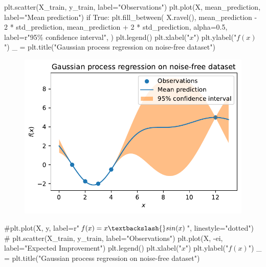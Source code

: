 \documentclass[
  letterpaper,
  DIV=11,
  numbers=noendperiod]{scrreprt}
\newenvironment{Shaded}{\begin{snugshade}}{\end{snugshade}}
\newcommand{\CommentTok}[1]{\textcolor[rgb]{0.37,0.37,0.37}{#1}}
\newcommand{\ControlFlowTok}[1]{\textcolor[rgb]{0.00,0.23,0.31}{#1}}
\newcommand{\DecValTok}[1]{\textcolor[rgb]{0.68,0.00,0.00}{#1}}
\newcommand{\FloatTok}[1]{\textcolor[rgb]{0.68,0.00,0.00}{#1}}
\newcommand{\NormalTok}[1]{\textcolor[rgb]{0.00,0.23,0.31}{#1}}
\newcommand{\OperatorTok}[1]{\textcolor[rgb]{0.37,0.37,0.37}{#1}}
\newcommand{\SpecialCharTok}[1]{\textcolor[rgb]{0.37,0.37,0.37}{#1}}
\newcommand{\StringTok}[1]{\textcolor[rgb]{0.13,0.47,0.30}{#1}}
\newcommand{\VariableTok}[1]{\textcolor[rgb]{0.07,0.07,0.07}{#1}}
\newcommand{\VerbatimStringTok}[1]{\textcolor[rgb]{0.13,0.47,0.30}{#1}}
\begin{document}
\begin{Shaded}
\begin{Highlighting}[]
\NormalTok{plt.scatter(X\_train, y\_train, label}\OperatorTok{=}\StringTok{"Observations"}\NormalTok{)}
\NormalTok{plt.plot(X, mean\_prediction, label}\OperatorTok{=}\StringTok{"Mean prediction"}\NormalTok{)}
\ControlFlowTok{if} \VariableTok{True}\NormalTok{:}
\NormalTok{    plt.fill\_between(}
\NormalTok{        X.ravel(),}
\NormalTok{        mean\_prediction }\OperatorTok{{-}} \DecValTok{2} \OperatorTok{*}\NormalTok{ std\_prediction,}
\NormalTok{        mean\_prediction }\OperatorTok{+} \DecValTok{2} \OperatorTok{*}\NormalTok{ std\_prediction,}
\NormalTok{        alpha}\OperatorTok{=}\FloatTok{0.5}\NormalTok{,}
\NormalTok{        label}\OperatorTok{=}\VerbatimStringTok{r"95}\SpecialCharTok{\% c}\VerbatimStringTok{onfidence interval"}\NormalTok{,}
\NormalTok{    )}
\NormalTok{plt.legend()}
\NormalTok{plt.xlabel(}\StringTok{"$x$"}\NormalTok{)}
\NormalTok{plt.ylabel(}\StringTok{"$f(x)$"}\NormalTok{)}
\NormalTok{\_ }\OperatorTok{=}\NormalTok{ plt.title(}\StringTok{"Gaussian process regression on noise{-}free dataset"}\NormalTok{)}
\end{Highlighting}
\end{Shaded}

\begin{figure}[H]

{\centering \includegraphics{07_spot_ei_files/figure-pdf/cell-45-output-1.pdf}

}

\end{figure}

\begin{Shaded}
\begin{Highlighting}[]
\CommentTok{\#plt.plot(X, y, label=r"$f(x) = x \textbackslash{}sin(x)$", linestyle="dotted")}
\CommentTok{\# plt.scatter(X\_train, y\_train, label="Observations")}
\NormalTok{plt.plot(X, }\OperatorTok{{-}}\NormalTok{ei, label}\OperatorTok{=}\StringTok{"Expected Improvement"}\NormalTok{)}
\NormalTok{plt.legend()}
\NormalTok{plt.xlabel(}\StringTok{"$x$"}\NormalTok{)}
\NormalTok{plt.ylabel(}\StringTok{"$f(x)$"}\NormalTok{)}
\NormalTok{\_ }\OperatorTok{=}\NormalTok{ plt.title(}\StringTok{"Gaussian process regression on noise{-}free dataset"}\NormalTok{)}
\end{Highlighting}
\end{Shaded}
\end{document}
